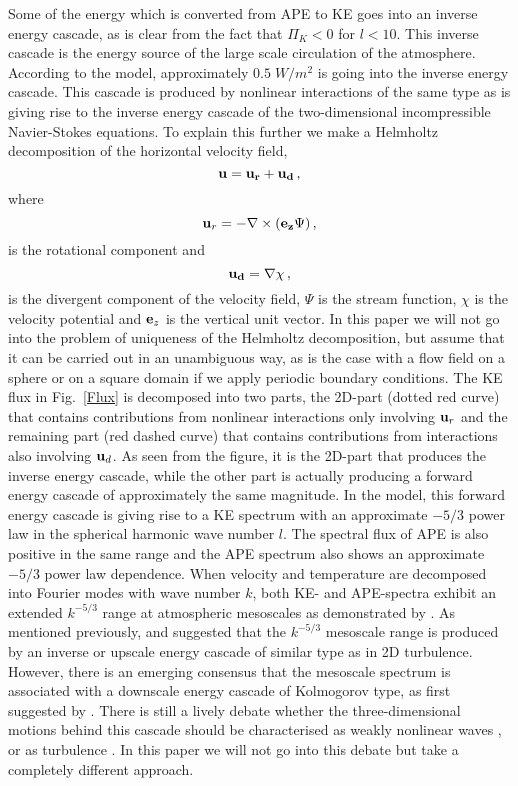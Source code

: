 Some of the energy which is converted from APE to KE goes into an inverse energy cascade, as is clear from the fact that $ \Pi_K < 0 $ for $ l < 10 $. This inverse cascade is the energy source of the large scale circulation of the atmosphere. According to the model, approximately $ 0.5 \; W/m^2 $ is going into the inverse energy cascade. This cascade is produced by nonlinear interactions of the same type as is giving rise to the inverse energy cascade of the two-dimensional incompressible Navier-Stokes equations. To explain this further we make a Helmholtz decomposition of the horizontal velocity field,
\begin{equation}
{\bf u} = \bf{u}_r + \bf{u}_d \, ,
\end{equation}
where
\begin{equation}  {\bf u}_r  = -\nabla \times ( {\bf e_z} \Psi) \, , \end{equation}
is the rotational component and
\begin{equation}  \bf {u}_d = \nabla \chi  \, , \end{equation}
is the divergent component of the velocity field,  $ \Psi  $ is the stream function,  $ \chi $ is the velocity potential and $ {\bf e}_z $ is the vertical unit vector.  In this paper we will not go into the problem of uniqueness of the Helmholtz decomposition, but assume that it can be carried out in an unambiguous way, as is the case  with a flow field on a sphere or on a square domain if we apply periodic boundary conditions.  The KE flux in Fig.~\ref{Flux} is decomposed into two parts,  the 2D-part (dotted red curve) that contains contributions from nonlinear interactions only involving $ {\bf u}_r $ and the remaining part (red dashed curve) that contains contributions from interactions also involving $ {\bf u}_d $. As seen from the figure, it is the 2D-part that produces the inverse energy cascade, while the other part is actually producing a forward energy cascade of approximately the same magnitude.
In the model, this forward energy cascade is giving rise to a KE spectrum with an approximate  $ -5/3 $ power law in the spherical harmonic wave number $ l $.    The spectral flux of APE is also positive in the same range and the APE spectrum also shows an approximate  $-5/3 $ power law dependence. When velocity and temperature are decomposed into Fourier modes with wave number $ k $, both KE- and APE-spectra exhibit an extended $ k^{-5/3} $ range at atmospheric mesoscales as  demonstrated by \citet{Nastrom-Gage:1985}.  As mentioned previously, \citet{Gage:1979} and \citet{Lilly:1983}    suggested that the $ k^{-5/3} $ mesoscale range is produced by an inverse or upscale energy cascade of similar type as in 2D turbulence. However, there is an emerging consensus that the mesoscale spectrum is associated with a downscale energy cascade of Kolmogorov type, as first suggested by \citet{Dewan:1979}. There is still a lively debate whether the three-dimensional motions behind this cascade should be characterised as weakly nonlinear waves \citep{Callies-Ferrari-Buhler:2014, Waite-Snyder:2013}, or as turbulence \citep{Lindborg:2015}. In this paper we will not go into this debate but take a completely different approach.



